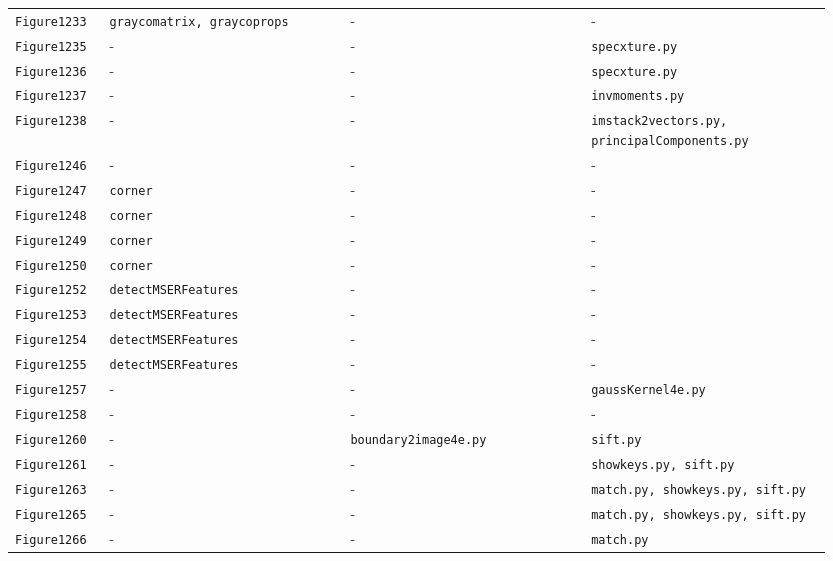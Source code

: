 \documentclass[10pt]{article}
\begin{document}
\begin{longtable}{p{0.11\linewidth} p{0.28\linewidth} p{0.28\linewidth} p{0.28\linewidth}}
\texttt{Figure1233} & \texttt{graycomatrix, graycoprops} & - & - \\
\texttt{Figure1235} & - & - & \texttt{specxture.py} \\
\texttt{Figure1236} & - & - & \texttt{specxture.py} \\
\texttt{Figure1237} & - & - & \texttt{invmoments.py} \\
\texttt{Figure1238} & - & - & \texttt{imstack2vectors.py, principalComponents.py} \\
\texttt{Figure1246} & - & - & - \\
\texttt{Figure1247} & \texttt{corner} & - & - \\
\texttt{Figure1248} & \texttt{corner} & - & - \\
\texttt{Figure1249} & \texttt{corner} & - & - \\
\texttt{Figure1250} & \texttt{corner} & - & - \\
\texttt{Figure1252} & \texttt{detectMSERFeatures} & - & - \\
\texttt{Figure1253} & \texttt{detectMSERFeatures} & - & - \\
\texttt{Figure1254} & \texttt{detectMSERFeatures} & - & - \\
\texttt{Figure1255} & \texttt{detectMSERFeatures} & - & - \\
\texttt{Figure1257} & - & - & \texttt{gaussKernel4e.py} \\
\texttt{Figure1258} & - & - & - \\
\texttt{Figure1260} & - & \texttt{boundary2image4e.py} & \texttt{sift.py} \\
\texttt{Figure1261} & - & - & \texttt{showkeys.py, sift.py} \\
\texttt{Figure1263} & - & - & \texttt{match.py, showkeys.py, sift.py} \\
\texttt{Figure1265} & - & - & \texttt{match.py, showkeys.py, sift.py} \\
\texttt{Figure1266} & - & - & \texttt{match.py} \\
\end{longtable}
\end{document}
